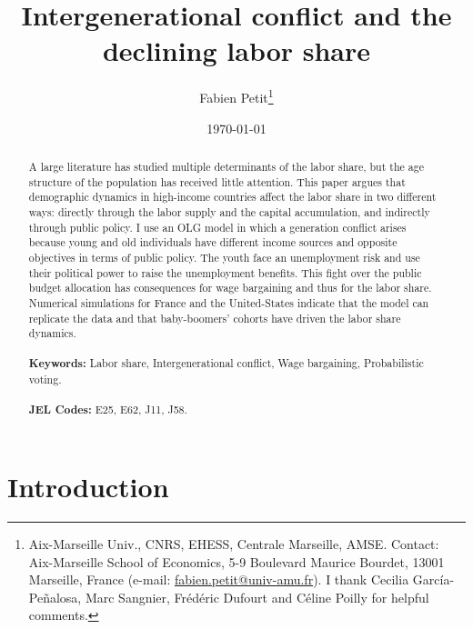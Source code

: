 \documentclass[12pt]{article}
\begin{document}
	
	\begin{titlepage}
		\title{Intergenerational conflict and the declining labor share}
		\author{Fabien Petit\thanks{Aix-Marseille Univ., CNRS, EHESS, Centrale Marseille, AMSE. Contact: Aix-Marseille School of Economics, 5-9 Boulevard Maurice Bourdet, 13001 Marseille, France (e-mail: \href{mailto:fabien.petit@univ-amu.fr}{fabien.petit@univ-amu.fr}). I thank Cecilia García-Peñalosa, Marc Sangnier, Frédéric Dufourt and Céline Poilly for helpful comments.}}
		\date{\today}
		\maketitle
		\begin{abstract}
			\noindent A large literature has studied multiple determinants of the labor share, but the age structure of the population has received little attention. This paper argues that demographic dynamics in high-income countries affect the labor share in two different ways: directly through the labor supply and the capital accumulation, and indirectly through public policy. I use an OLG model in which a generation conflict arises because young and old individuals have different income sources and opposite objectives in terms of public policy. The youth face an unemployment risk and use their political power to raise the unemployment benefits. This fight over the public budget allocation has consequences for wage bargaining and thus for the labor share. Numerical simulations for France and the United-States indicate that the model can replicate the data and that baby-boomers' cohorts have driven the labor share dynamics.\\
			\vspace{0in}\\
			\noindent\textbf{Keywords:} Labor share, Intergenerational conflict, Wage bargaining, Probabilistic voting.\\
			\vspace{0in}\\
			\noindent\textbf{JEL Codes:} E25, E62, J11, J58.\\
			
			\bigskip
		\end{abstract}
		\setcounter{page}{0}
		\thispagestyle{empty}
	\end{titlepage}
	\pagebreak \newpage
	
	\doublespacing
	
	\section{Introduction} \label{sec:introduction}
	
	
\end{document}
